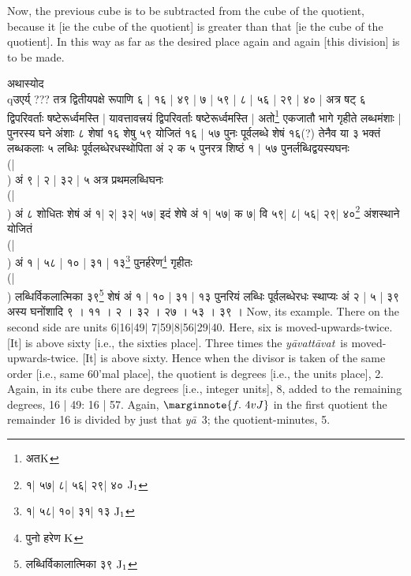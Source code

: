 \documentclass[11pt,a5paper]{book}
\def\yavattavat{\textit{y\=avatt\=avat}}
\def\ya{\textit{y\=a}}
\def\danda{$|$}
\begin{document}
{Now, the previous cube is to be subtracted from the cube of the quotient, because
it [ie the cube of the quotient] is greater than that [ie the cube of the quotient]. In this way as far as the desired place again and again [this division] is to be made.
\newpage 

{\s अथास्योद \\qउएर्य् ??? 
तत्र द्वितीयपक्षे रूपाणि ६ | १६ | ४९ | ७ | ५९ | ८ | ५६ | २९ | ४० | 
अत्र षट् ६ द्विपरिवर्ताः षष्टेरूर्ध्वमस्ति | 
यावत्तावत्त्रयं द्विपरिवर्ताः षष्टेरूर्ध्वमस्ति | 
अतो\footnote{{\s अत}${\rm K}$} एकजातौ 
भागे गृहीते लब्धमंशाः | 
पुनरस्य घने अंशाः ८ शेषां १६ शेषु ५९ योजितं
१६ | ५७  पुनः पूर्वलब्धे शेषं १६(?) तेनैव या ३
भक्तं लब्धकलाः ५ लब्धिः पूर्वलब्धेरधस्थोपिता अं २
क ५ पुनरत्र शिष्ठं १ | ५७ पुनर्लब्धिद्वयस्यघनः\\(|\\)
अं ९ | २ | ३२ | ५ अत्र प्रथमलब्धिघनः\\(|\\)
अं ८ शोधितः शेषं अं १| २| ३२| ५७|
इदं शेषे अं १| ५७| क ७| वि ५९| ८| ५६| २९| ४०\footnote{{\s १| ५७| %
८| ५६| २९| ४० } ${\rm J_1}$}
अंशस्थाने योजितं \\(|\\) अं १ | ५८ | १० | ३१ | १३\footnote{{\s १| ५८| %
 १०| ३१| १३} ${\rm J_1}$}
पुनर्हरेण\footnote{{\s पुनो हरेण} ${\rm K}$}
गृहीतः \\(|\\)
लब्धिर्विकलात्मिका ३९\footnote{{\s लब्धिर्विकालात्मिका ३९ } ${\rm J_1}$}
शेषं अं १ | १० | ३१ | १३ पुनरियं लब्धिः पूर्वलब्धेरधः स्थाप्यः
अं २ | ५ | ३९
अस्य घनोंशादि ९ । ११ । २ । ३२ । २७ । ५३ । ३९ ।}
\newpage 
Now, its example. There on the second side are units 6\danda 16\danda 49\danda
7\danda 59\danda 8\danda 56\danda 29\danda 40. Here, six is moved-upwards-twice. [It] is above sixty [i.e., the sixties place]. 
Three times the \yavattavat\ is moved-upwards-twice. [It] is above sixty. 
Hence when the divisor is taken of the same order [i.e., same 60'mal place],
the quotient is degrees [i.e., the
units place], 2.
Again, in its cube there are degrees [i.e., integer units], 8, added to the remaining degrees, 16 | 49: 16 | 57. 
Again,
$\marginnote{f.~4v J}$
in the first quotient the remainder 16 is divided by just that \ya\ 3; the quotient-minutes, 5.
}
\end{document}
